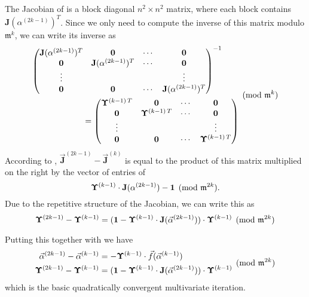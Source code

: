 The Jacobian of  is a block diagonal
$n^{2}\times n^{2}$ matrix, where each block contains
$\mathbf{J}(\alpha^{(2k-1)})^{T}$.  Since we only need to compute the
inverse of this matrix modulo $\mathfrak{m}^{k}$, we can write its
inverse as
\[
\begin{aligned}
\begin{pmatrix}
 \mathbf{J}(\alpha^{(2k-1)})^T & {\bf 0} & \cdots & {\bf 0}\\
 {\bf 0} & \mathbf{J}(\alpha^{(2k-1)})^T & \cdots & {\bf 0} \\
 \vdots  & & & \vdots \\
 {\bf 0} & {\bf 0} & \cdots & \mathbf{J}(\alpha^{(2k-1)})^T \end{pmatrix}^{-1} \qquad\\
 = 
\begin{pmatrix}
 \mathbf{\Upsilon}^{(k-1) \, T} & {\bf 0} & \cdots & {\bf 0}\\
 {\bf 0} & \mathbf{\Upsilon}^{(k-1) \, T} & \cdots & {\bf 0} \\
 \vdots  & & & \vdots \\
 {\bf 0} & {\bf 0} & \cdots & \mathbf{\Upsilon}^{(k-1) \, T} \end{pmatrix}
\end{aligned}
\pmod{\mathfrak{m}^{k}}
\]
According to , $\vec{\mathbf{J}}^{(2k-1)} - \vec{\mathbf{J}}^{(k)}$
is equal to the product of this matrix multiplied on the right by the
vector of entries of 
\[
\mathbf{\Upsilon}^{(k-1)} \cdot \mathbf{J}(\alpha^{(2k-1)}) - {\bf 1} \pmod{\mathfrak{m}^{2k}}.
\]
Due to the repetitive structure of the Jacobian, we can write this as 
\begin{equation}
\mathbf{\Upsilon}^{(2k-1)} - \mathbf{\Upsilon}^{(k-1)} =
({\bf 1} - \mathbf{\Upsilon}^{(k-1)} \cdot \mathbf{J}(\vec{\alpha}^{(2k-1)})) \cdot 
\mathbf{\Upsilon}^{(k-1)} \pmod{\mathfrak{m}^{2k}}
\label{MNewton:3:Eq}
\end{equation}

Putting this together with  we have
\begin{equation}
\label{Quasi:MNewton:Eq}
 \begin{aligned}
   \vec{\alpha}^{(2k-1)} - \vec{\alpha}^{(k-1)} & 
      = -\mathbf{\Upsilon}^{(k-1)}\cdot \vec{f}(\vec{\alpha}^{(k-1)}) \\
   \mathbf{\Upsilon}^{(2k-1)} - \mathbf{\Upsilon}^{(k-1)} &=
     ({\bf 1} - \mathbf{\Upsilon}^{(k-1)} \cdot \mathbf{J}(\vec{\alpha}^{(2k-1)})) 
          \cdot \mathbf{\Upsilon}^{(k-1)}
 \end{aligned}
 \pmod{\mathfrak{m}^{2k}}
\end{equation}
which is the basic quadratically convergent multivariate iteration.

